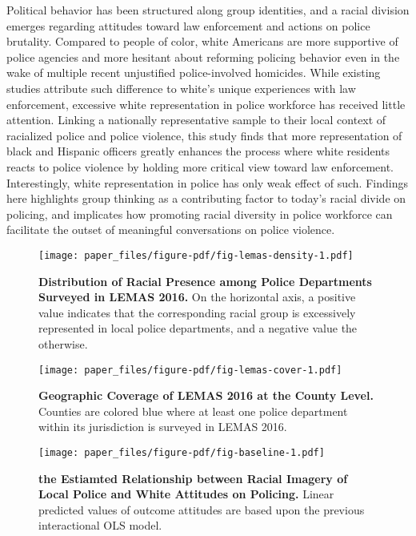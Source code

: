 \documentclass[
  11pt,
]{article}
\begin{document}
Political behavior has been structured along group identities, and a
racial division emerges regarding attitudes toward law enforcement and
actions on police brutality. Compared to people of color, white
Americans are more supportive of police agencies and more hesitant about
reforming policing behavior even in the wake of multiple recent
unjustified police-involved homicides. While existing studies attribute
such difference to white's unique experiences with law enforcement,
excessive white representation in police workforce has received little
attention. Linking a nationally representative sample to their local
context of racialized police and police violence, this study finds that
more representation of black and Hispanic officers greatly enhances the
process where white residents reacts to police violence by holding more
critical view toward law enforcement. Interestingly, white
representation in police has only weak effect of such. Findings here
highlights group thinking as a contributing factor to today's racial
divide on policing, and implicates how promoting racial diversity in
police workforce can facilitate the outset of meaningful conversations
on police violence.

\begin{figure}[t]

{\centering \texttt{[image: paper\_files/figure-pdf/fig-lemas-density-1.pdf]}

}

\caption{\label{fig-lemas-density}\textbf{Distribution of Racial
Presence among Police Departments Surveyed in LEMAS 2016.} On the
horizontal axis, a positive value indicates that the corresponding
racial group is excessively represented in local police departments, and
a negative value the otherwise.}

\end{figure}

\begin{figure}[t]

{\centering \texttt{[image: paper\_files/figure-pdf/fig-lemas-cover-1.pdf]}

}

\caption{\label{fig-lemas-cover}\textbf{Geographic Coverage of LEMAS
2016 at the County Level.} Counties are colored blue where at least one
police department within its jurisdiction is surveyed in LEMAS 2016.}

\end{figure}

\begin{figure}[t]

{\centering \texttt{[image: paper\_files/figure-pdf/fig-baseline-1.pdf]}

}

\caption{\label{fig-baseline}\textbf{the Estiamted Relationship between
Racial Imagery of Local Police and White Attitudes on Policing.} Linear
predicted values of outcome attitudes are based upon the previous
interactional OLS model.}

\end{figure}
\end{document}
